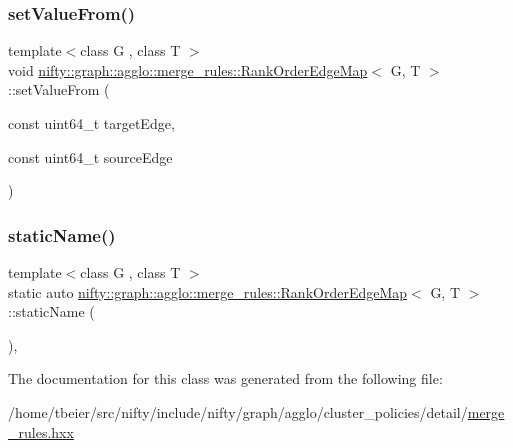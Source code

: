 \mbox{\label{classnifty_1_1graph_1_1agglo_1_1merge__rules_1_1RankOrderEdgeMap_abd93ae043ad33066b05aeea3d8417a30}} 
\subsubsection{\texorpdfstring{set\+Value\+From()}{setValueFrom()}}
{\footnotesize\ttfamily template$<$class G , class T $>$ \\
void \hyperlink{classnifty_1_1graph_1_1agglo_1_1merge__rules_1_1RankOrderEdgeMap}{nifty\+::graph\+::agglo\+::merge\+\_\+rules\+::\+Rank\+Order\+Edge\+Map}$<$ G, T $>$\+::set\+Value\+From (\begin{DoxyParamCaption}\item[{const uint64\+\_\+t}]{target\+Edge,  }\item[{const uint64\+\_\+t}]{source\+Edge }\end{DoxyParamCaption})\hspace{0.3cm}{\ttfamily [inline]}}

\mbox{\label{classnifty_1_1graph_1_1agglo_1_1merge__rules_1_1RankOrderEdgeMap_aa13bc5263991b55d9c7a1660dfb33b04}} 
\subsubsection{\texorpdfstring{static\+Name()}{staticName()}}
{\footnotesize\ttfamily template$<$class G , class T $>$ \\
static auto \hyperlink{classnifty_1_1graph_1_1agglo_1_1merge__rules_1_1RankOrderEdgeMap}{nifty\+::graph\+::agglo\+::merge\+\_\+rules\+::\+Rank\+Order\+Edge\+Map}$<$ G, T $>$\+::static\+Name (\begin{DoxyParamCaption}{ }\end{DoxyParamCaption})\hspace{0.3cm}{\ttfamily [inline]}, {\ttfamily [static]}}



The documentation for this class was generated from the following file\+:\begin{DoxyCompactItemize}
\item 
/home/tbeier/src/nifty/include/nifty/graph/agglo/cluster\+\_\+policies/detail/\hyperlink{merge__rules_8hxx}{merge\+\_\+rules.\+hxx}\end{DoxyCompactItemize}
